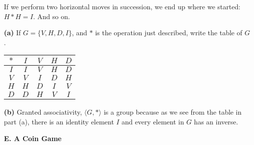\documentclass[12pt]{article}   %
\begin{document}
If we perform two horizontal moves in succession, we end up where we started: $H * H = I$. And so on. 

\bigskip
\noindent\textbf{(a)} If $G = \{V, H, D, I \}$, and $*$ is the operation just described, write the table of $G$. \\

\begin{tabular}{c | c c c c}
$*$ & $I$ & $V$ & $H$ & $D$ \\
\hline
$I$ & $I$ & $V$ & $H$ & $D$ \\
$V$ & $V$ & $I$ & $D$ & $H$ \\
$H$ & $H$ & $D$ & $I$ & $V$ \\
$D$ & $D$ & $H$ & $V$ & $I$
\end{tabular}


\bigskip
\noindent\textbf{(b)}
Granted associativity, $\langle G, * \rangle$ is a group because as we see from the table in part (a), there is an identity element $I$ and every element in $G$ has an inverse.

\bigskip

\noindent\textbf{E. A Coin Game} \smallskip
\end{document}
